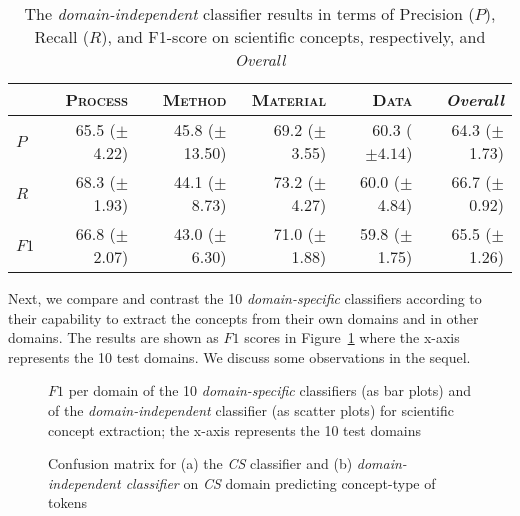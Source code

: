 \documentclass[runningheads]{llncs}
\begin{document}
\begin{table}[htb]
\small
\caption{The \textit{domain-independent} classifier results in terms of Precision ($P$), Recall ($R$), and F1-score on scientific concepts, respectively, and \textit{Overall}}
\begin{tabular}{p{3.5mm}|rrrr|r}
            & \multicolumn{1}{p{20mm}}{\textsc{Process}} & \multicolumn{1}{p{20mm}}{\textsc{Method}} & \multicolumn{1}{p{20mm}}{\textsc{Material}} & \multicolumn{1}{p{20mm}}{\textsc{Data}}
            & \multicolumn{1}{p{20mm}}{\textit{Overall}} \\ \hline
$P$  & 65.5 ($\pm$ 4.22)   & 45.8 ($\pm$ 13.50)    & 69.2 ($\pm$ 3.55)      & 60.3 ($\pm 4.14$)      & 64.3 ($\pm$ 1.73)   \\
$R$  & 68.3 ($\pm$ 1.93)  & 44.1 ($\pm$ 8.73)   & 73.2 ($\pm$ 4.27)     & 60.0 ($\pm$ 4.84)    & 66.7  ($\pm$ 0.92)    \\
$F1$ & 66.8  ($\pm$ 2.07)  & 43.0 ($\pm$ 6.30)  & 71.0 ($\pm$ 1.88)      & 59.8 ($\pm$ 1.75)      & 65.5 ($\pm$ 1.26)      
\end{tabular}
\label{table:4}
\end{table}

Next, we compare and contrast the 10 \textit{domain-specific}
classifiers according to their capability to extract the concepts from their own domains and in other domains.
The results are shown as $F1$ scores in Figure~\ref{fig:2} where the x-axis represents the 10 test domains. We discuss some observations in the sequel.

\begin{figure}[htb]
    \caption{$F1$ per domain of the 10 \textit{domain-specific} classifiers (as bar plots) and of the \textit{domain-independent} classifier (as scatter plots) for scientific concept extraction; the x-axis represents the 10 test domains}
    \label{fig:2}
\end{figure}

\begin{figure}[!htb]
    \centering
    \qquad
        
    \caption{Confusion matrix for (a) the \textit{CS} classifier and (b) \textit{domain-independent classifier} on \textit{CS} domain predicting concept-type of tokens}
    \label{fig:cm}
\end{figure}
\end{document}
